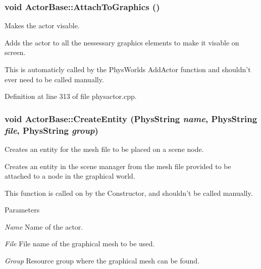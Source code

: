 \hypertarget{classActorBase_afab604970fede16ccde0c6b8e72d9ee0}{
\subsubsection[{AttachToGraphics}]{\setlength{\rightskip}{0pt plus 5cm}void ActorBase::AttachToGraphics ()}}
\label{dd/d7b/classActorBase_afab604970fede16ccde0c6b8e72d9ee0}


Makes the actor visable. 

Adds the actor to all the nessessary graphics elements to make it visable on screen. \par
 This is automaticly called by the PhysWorlds AddActor function and shouldn't ever need to be called manually. 

Definition at line 313 of file physactor.cpp.

\hypertarget{classActorBase_aa87583c47b8653e8ac7d96f1481b57fd}{
\subsubsection[{CreateEntity}]{\setlength{\rightskip}{0pt plus 5cm}void ActorBase::CreateEntity (PhysString {\em name}, \/  PhysString {\em file}, \/  PhysString {\em group})}}
\label{dd/d7b/classActorBase_aa87583c47b8653e8ac7d96f1481b57fd}


Creates an entity for the mesh file to be placed on a scene node. 

Creates an entity in the scene manager from the mesh file provided to be attached to a node in the graphical world. \par
 This function is called on by the Constructor, and shouldn't be called manually. 
\begin{DoxyParams}{Parameters}
\item[{\em Name}]Name of the actor. \item[{\em File}]File name of the graphical mesh to be used. \item[{\em Group}]Resource group where the graphical mesh can be found. \end{DoxyParams}


